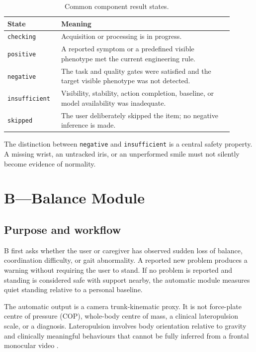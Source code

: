 \documentclass[11pt,a4paper]{article}
\begin{document}
\begin{table}[htbp]
\centering
\caption{Common component result states.}
\begin{tabular}{p{0.20\linewidth}p{0.70\linewidth}}
\toprule
State & Meaning \\
\midrule
\texttt{checking} & Acquisition or processing is in progress. \\
\texttt{positive} & A reported symptom or a predefined visible phenotype met the current engineering rule. \\
\texttt{negative} & The task and quality gates were satisfied and the target visible phenotype was not detected. \\
\texttt{insufficient} & Visibility, stability, action completion, baseline, or model availability was inadequate. \\
\texttt{skipped} & The user deliberately skipped the item; no negative inference is made. \\
\bottomrule
\end{tabular}
\end{table}

The distinction between \texttt{negative} and \texttt{insufficient} is a central safety property. A missing wrist, an untracked iris, or an unperformed smile must not silently become evidence of normality.

\section{B---Balance Module}

\subsection{Purpose and workflow}

B first asks whether the user or caregiver has observed sudden loss of balance, coordination difficulty, or gait abnormality. A reported new problem produces a warning without requiring the user to stand. If no problem is reported and standing is considered safe with support nearby, the automatic module measures quiet standing relative to a personal baseline.

The automatic output is a camera trunk-kinematic proxy. It is not force-plate centre of pressure (COP), whole-body centre of mass, a clinical lateropulsion scale, or a diagnosis. Lateropulsion involves body orientation relative to gravity and clinically meaningful behaviours that cannot be fully inferred from a frontal monocular video \cite{dai2021lateropulsion,dai2022lateropulsion}.
\end{document}
